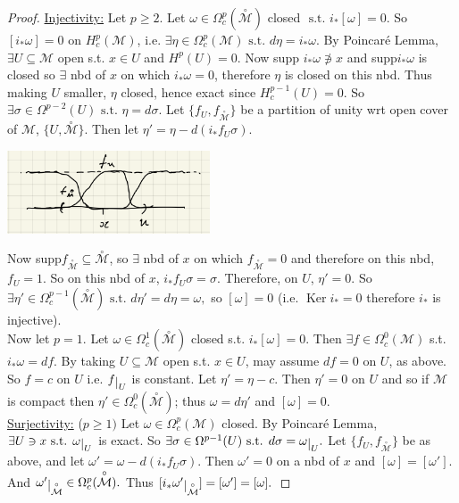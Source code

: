 \documentclass[10pt]{article}
\theoremstyle{plain}
\theoremstyle{definition}
\newcommand{\st}{\text{ s.t. }}
\newcommand{\man}{\mathcal{M}}
\newcommand{\compactpformman}[1]{\Omega^{#1}_c(\man)}
\newcommand{\deriv}{d}
\newcommand{\df}{df}
\newcommand{\deta}{\deriv\eta}
\def\restrict#1{\raise-.5ex\hbox{\ensuremath|}_{#1}}
\DeclareMathOperator{\Ker}{Ker}
\newcommand{\compactcohomman}[1]{H_c^{#1}(\man)}
\newcommand{\puncman}{\overset{\circ}{\man}}
\begin{document}
\begin{proof}
\underline{Injectivity:} Let $p\geq 2$. Let $\omega \in \Omega_c^p(\puncman)$ closed $\st i_*[\omega] = 0.$ So $[i_* \omega] = 0$ on $\compactcohomman{p}$, i.e. $\exists \eta \in \compactpformman{p} \st \deta = i_* \omega.$ By Poincar\'e Lemma, $\exists U \subseteq \man$ open s.t. $x\in U$ and $H^p(U) = 0.$ Now supp $i_*\omega \not\ni x$ and supp$i_* \omega$ is closed so $\exists$ nbd of $x$ on which $i_*\omega = 0$, therefore $\eta$ is closed on this nbd. Thus making $U$ smaller, $\eta$ closed, hence exact since $H^{p-1}_c(U) = 0$. So $\exists \sigma  \in \Omega^{p-2}(U) \st \eta = \deriv \sigma$. Let $\{f_U, f_{\puncman}\}$ be a partition of unity wrt open cover of $\man$, $\{U,\puncman\}$. Then let $\eta' = \eta - \deriv(i_*f_U \sigma)$.
\begin{center}\includegraphics[width=0.45\textwidth]{Images/PuncturedManifoldProposition.png}\end{center}
Now supp$f_{\puncman}\subseteq \puncman$, so $\exists$ nbd of $x$ on which $f_{\puncman} = 0$ and therefore on this nbd, $f_U = 1.$ So on this nbd of $x$, $i_*f_U \sigma = \sigma$. Therefore, on $U$, $\eta' = 0.$ So $\exists \eta' \in \Omega_c ^{p-1} (\puncman) \st \deta ' = \deta = \omega,$ so $[\omega] = 0$ (i.e. $\Ker i_* = 0$ therefore $i_*$ is injective).\\
Now let $p = 1.$ Let $\omega \in \Omega_c^1(\puncman) $ closed s.t. $i_* [ \omega ] = 0.$ Then $\exists f \in \Omega_c^0(\man)$ s.t. $i_*\omega = \df$. By taking $U \subseteq \man $ open s.t. $x\in U$, may assume $\df = 0$ on $U$, as above. So $f = c$ on $U$ i.e. $f\restrict{U}$ is constant. Let $\eta' = \eta -c$. Then $\eta' = 0$ on $U$ and so if $\man$ is compact then $\eta' \in \Omega_c^0(\puncman)$; thus $\omega = \deta' $ and $[\omega] = 0$.\\
\underline{Surjectivity:} ($p\geq 1)$ Let $\omega \in \compactpformman{p}$ closed. By Poincar\'e Lemma, $\exists U \ni x \st \omega \restrict{U} $ is exact. So $\exists \sigma \in \Omega^{p-1}(U) \st \deriv \sigma = \omega \restrict{U}.$ Let $\{f_U, f_{\puncman}\}$ be as above, and let $\omega' = \omega - \deriv(i_* f_U \sigma)$. Then $\omega ' = 0 $ on a nbd of $x$ and $[\omega ] = [\omega ' ].$ And $\omega ' \restrict{\puncman} \in \Omega_c^p(\puncman).$ Thus $[i_*\omega' \restrict{\puncman}] = [\omega'] = [\omega].$
\end{proof}
\end{document}
